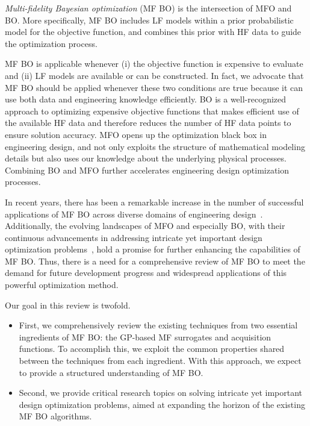 \documentclass[iicol,sn-basic]{sn-jnl}%
\begin{document}
\textit{Multi-fidelity Bayesian optimization} (MF BO) is the intersection of MFO and BO. More specifically, MF BO includes LF models within a prior probabilistic model for the objective function, and combines this prior with HF data to guide the optimization process.

MF BO is applicable whenever (i) the objective function is expensive to evaluate and (ii) LF models are available or can be constructed.
In fact, we advocate that MF BO should be applied whenever these two conditions are true because it can use both data and engineering knowledge efficiently.
BO is a well-recognized approach to optimizing expensive objective functions that makes efficient use of the available HF data and therefore reduces the number of HF data points to ensure solution accuracy.
MFO opens up the optimization black box in engineering design, and not only exploits the structure of mathematical modeling details but also uses our knowledge about the underlying physical processes.
Combining BO and MFO further accelerates engineering design optimization processes.

In recent years, there has been a remarkable increase in the number of successful applications of MF BO across diverse domains of engineering design~\citep[see e.g.,][]{Perdikaris2017,Meliani2019,Tran2020cise,Hebbal2021oe,Khatamsaz2021md}.
Additionally, the evolving landscapes of MFO and especially BO, with their continuous advancements in addressing intricate yet important design optimization problems~\citep{Frazier2018,Wang2023}, hold a promise for further enhancing the capabilities of MF BO.
Thus, there is a need for a comprehensive review of MF BO to meet the demand for future development progress and widespread applications of this powerful optimization method.

Our goal in this review is twofold.
\begin{itemize}
	\item First, we comprehensively review the existing techniques from two essential ingredients of MF BO: the GP-based MF surrogates and acquisition functions.
	To accomplish this, we exploit the common properties shared between the techniques from each ingredient.
	With this approach, we expect to provide a structured understanding of MF BO.
	
	\item Second, we provide critical research topics on solving intricate yet important design optimization problems, aimed at expanding the horizon of the existing MF BO algorithms.	
\end{itemize} 
\end{document}
